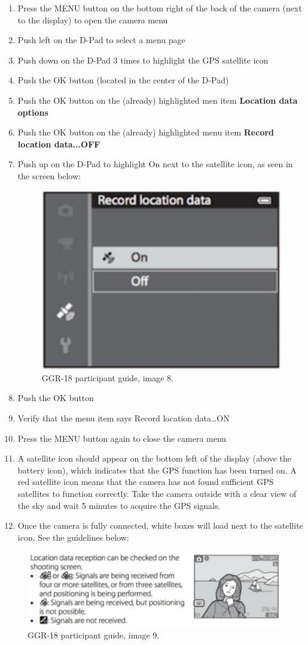 \begin{enumerate}
    \item Press the MENU button on the bottom right of the back of the camera (next to the display) to open the camera menu
    \item Push left on the D-Pad to select a menu page
    \item Push down on the D-Pad 3 times to highlight the GPS satellite icon
    \item Push the OK button (located in the center of the D-Pad)
    \item Push the OK button on the (already) highlighted men item \textbf{Location data options}
    \item Push the OK button on the (already) highlighted menu item \textbf{Record location data...OFF}
    \item Push up on the D-Pad to highlight On next to the satellite icon, as seen in the screen below:

          \begin{figure}[H]
              \begin{center}
                  \includegraphics[width=0.4\linewidth]{resources/guide8.pdf}
              \end{center}
              \caption{GGR-18 participant guide, image 8.}
          \end{figure}

    \item Push the OK button
    \item Verify that the menu item says Record location data…ON
    \item Press the MENU button again to close the camera menu
    \item A satellite icon should appear on the bottom left of the display (above the battery icon), which indicates that the GPS function has been turned on. A red satellite icon means that the camera has not found sufficient GPS satellites to function correctly. Take the camera outside with a clear view of the sky and wait 5 minutes to acquire the GPS signals.
    \item Once the camera is fully connected, white boxes will load next to the satellite icon. See the guidelines below:
\end{enumerate}

\begin{figure}[H]
    \begin{center}
        \includegraphics[width=0.8\linewidth]{resources/guide1.pdf}
    \end{center}
    \caption{GGR-18 participant guide, image 9.}
\end{figure}
